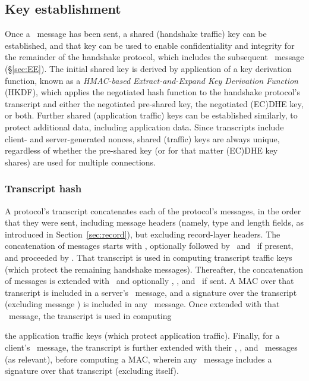 \subsection{Key establishment}\label{sec:hkdf}

Once a \ServerHello\ message has been sent, a shared (handshake traffic) key can be 
established, and that key can be used to enable confidentiality 
and integrity for the remainder of the handshake protocol, which includes the 
subsequent \EncryptedExtensions\ message (\S\ref{sec:EE}). The initial shared key 
is derived by application of a key derivation function, 
known as a \emph{HMAC-based Extract-and-Expand Key Derivation Function} (HKDF),
which applies the negotiated hash function to the handshake protocol's 
transcript and either the negotiated pre-shared key, the negotiated (EC)DHE key,
or both. Further shared (application traffic) keys can be established 
similarly, to protect additional data, including application data.
Since transcripts include client- and server-generated nonces, shared (traffic) keys
are always unique, regardless of whether the pre-shared key (or for that matter
(EC)DHE key shares) are used for multiple connections.

\subsubsection{Transcript hash}\label{sec:hkdf:transcript}

A protocol's transcript concatenates each of the protocol's 
messages, in the order that they were sent, including message headers (namely, type 
and length fields, as introduced in Section~\ref{sec:record}), 
but excluding record-layer headers. The concatenation of messages
starts with \ClientHello, optionally followed by \HelloRetryRequest\ 
and \ClientHello\ if present, and proceeded by \ServerHello.
That transcript is used in computing transcript traffic keys 
(which protect the remaining handshake messages). Thereafter, 
the concatenation of messages is extended with \EncryptedExtensions\
and optionally \CertificateRequest, \Certificate, and 
\CertificateVerify\ if sent. A MAC over that transcript 
is included in a server's \Finished\ message, and a signature
over the transcript (excluding message \CertificateVerify) is 
included in any \CertificateVerify\ message. Once extended with
that \Finished\ message, the transcript is used in computing
%
\begin{comment}
the application traffic key. 
\end{comment}
%
%
the application traffic keys (which protect application traffic).
Finally, for a client's \Finished\ message, the transcript
is further extended with their \EndOfEarlyData, \Certificate,  
and \CertificateVerify\ messages (as relevant), before computing a 
MAC, wherein any \CertificateVerify\ message includes a signature over
that transcript (excluding itself). 
%
\begin{comment}
Finally, the client's application
traffic key is computed after extending the transcript with the 
client's \Finished\ message.
\end{comment}


